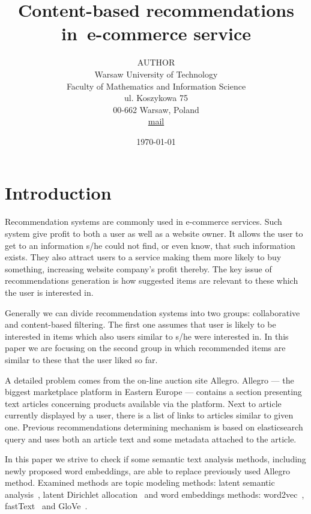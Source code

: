 \documentclass[twoside,twocolumn]{article}
\title{Content-based recommendations in~e-commerce service} %
\author{%
	\textsc{AUTHOR}\\[1ex]%
	\normalsize Warsaw University of Technology \\ %
	\normalsize Faculty of Mathematics and Information Science \\
	\normalsize ul. Koszykowa 75 \\
	\normalsize 00-662 Warsaw, Poland \\
	\normalsize \href{mailto:mail}{mail} %
}
\date{\today} %
\begin{document}
	\maketitle
	\section{Introduction}
	
	Recommendation systems are commonly used in e-commerce services. Such system give profit to both a user as well as a website owner. It allows the user to get to an information s/he could not find, or even know, that such information exists. They also attract users to a service making them more likely to buy something, increasing website company's profit thereby. The key issue of recommendations generation is how suggested items are relevant to these which the user is interested in. 
	
	Generally we can divide recommendation systems into two groups: collaborative and content-based filtering. The first one assumes that user is likely to be interested in items which also users similar to s/he were interested in. In this paper we are focusing on the second group in which recommended items are similar to these that the user liked so far.
	
	A detailed problem comes from the on-line auction site Allegro. Allegro --- the biggest marketplace platform in Eastern Europe --- contains a section presenting text articles concerning products available via the platform. Next to article currently displayed by a user, there is a list of links to articles similar to given one. Previous recommendations determining mechanism is based on elasticsearch query and uses both an article text and some metadata attached to the article.
	
	In this paper we strive to check if some semantic text analysis methods, including newly proposed word embeddings, are able to replace previously used Allegro method. Examined methods are topic modeling methods: latent semantic analysis~\cite{lsa}, latent Dirichlet allocation~\cite{lda} and word embeddings methods: word2vec~\cite{word2vec}, fastText~\cite{fasttext} and GloVe~\cite{glove}.
	
\end{document}
